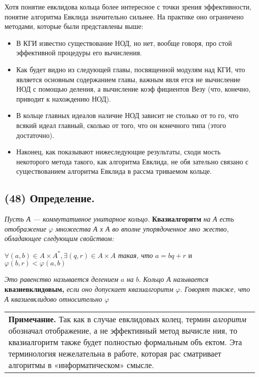 \documentclass{mai_book}
\begin{document}
Хотя понятие евклидова кольца более интересное с точки зрения
эффективности, понятие алгоритма Евклида значительно сильнее. На
практике оно ограничено методами, которые были представлены выше:
\begin{itemize}


\item В КГИ известно существование НОД, но нет, вообще говоря, про­
стой эффективной процедуры его вычисления.

\item Как будет видно из следующей главы, посвященной модулям над
КГИ, что является основным содержанием главы, важным явля­
ется не вычисление НОД с помощью деления, а вычисление коэф­
фициентов Везу (что, конечно, приводит к нахождению НОД).

\item В кольце главных идеалов наличие НОД зависит не столько от то­
го, что всякий идеал главный, сколько от того, что он конечного
типа (этого достаточно).
\newpage 
\item Наконец, как показывают нижеследующие результаты, сходи­
мость некоторого метода такого, как алгоритма Евклида, не обя­
зательно связано с существованием алгоритма Евклида в рассма­
триваемом кольце.
\end{itemize}
\subsection*{(48) Определение.}
\textit{Пусть А — коммутативное унитарное кольцо.} \textbf{Квазиалгоритм} \textit{на
А есть отображение} $\varphi$ \textit {множества А х А во вполне упорядоченное мно­
жество, обладающее следующим свойством:}
\begin{center}
$\forall(a,b)\in A\times A^*, \exists(q,r)\in A\times A$ \textit{такая, что} $a = bq + r$ и $\varphi(b,r)<\varphi(a,b)$
\end{center}
\textit{Это равенство называется делением} $a$ \textit{на} $b$. \textit{Кольцо А
называется} \textbf{квазиевклидовым,} \textit{если оно допускает квазиалгоритм} $\varphi$. \textit{Говорят также, что А квазиевклидово относительно $\varphi$}
\begin{center}
\begin{tabular}{p{12cm}}
\textbf{Примечание.} Так как в случае евклидовых колец, термин \textit{алго­ритм} обозначал отображение, а не эффективный метод вычисле­
ния, то квазиалгоритм также будет полностью формальным объ­
ектом. Эта терминология нежелательна в работе, которая рас­
сматривает алгоритмы в «информатическом» смысле.
\end{tabular}
\end{center}
\end{document}
